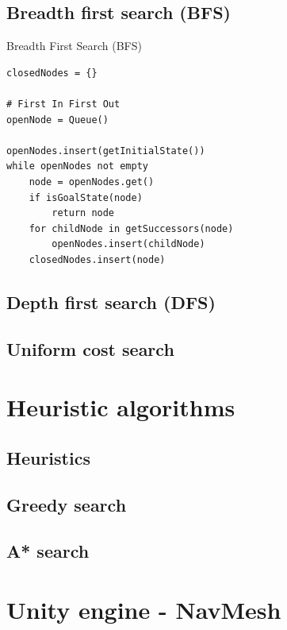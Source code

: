 \documentclass{beamer}
\begin{document}
\subsection{Breadth first search (BFS)}

\begin{frame}[fragile]{Breadth First Search (BFS)}
	\begin{lstlisting}
closedNodes = {}

# First In First Out
openNode = Queue()

openNodes.insert(getInitialState())
while openNodes not empty 
	node = openNodes.get()
	if isGoalState(node)
		return node
	for childNode in getSuccessors(node)
		openNodes.insert(childNode)
	closedNodes.insert(node)
	\end{lstlisting}
\end{frame}

\subsection{Depth first search (DFS)}

\subsection{Uniform cost search}


\section{Heuristic algorithms}

\subsection{Heuristics}

\subsection{Greedy search}

\subsection{A* search}


\section{Unity engine - NavMesh}
\end{document}

